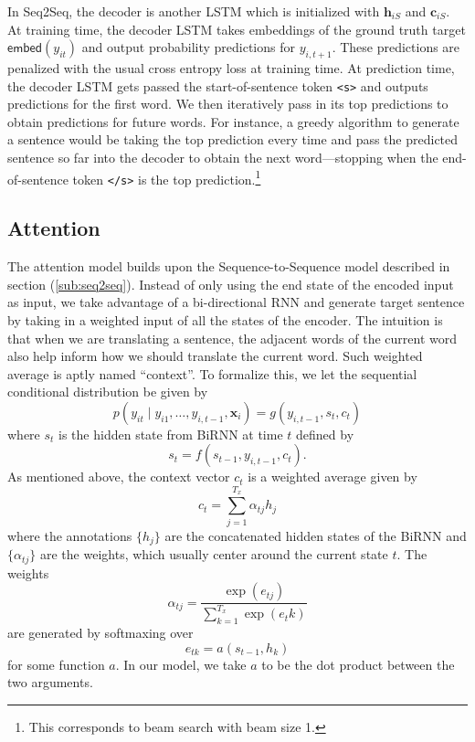 \documentclass[12pt]{article}
\newcommand{\sts}{Seq2Seq}
\newcommand{\embed}{\mathsf{embed}}
\begin{document}
In \sts{}, the decoder is another LSTM which is initialized with $\bm h_{iS}$ and $\bm c_{iS}$. At training time, the decoder LSTM takes embeddings of the ground truth target $\embed(y_{it})$ and output probability predictions for $y_{i,t+1}$. These predictions are penalized with the usual cross entropy loss at training time. At prediction time, the decoder LSTM gets passed the start-of-sentence token \texttt{<s>} and outputs predictions for the first word. We then iteratively pass in its top predictions to obtain predictions for future words. For instance, a greedy algorithm to generate a sentence would be taking the top prediction every time and pass the predicted sentence so far into the decoder to obtain the next word---stopping when the end-of-sentence token \texttt{</s>} is the top prediction.\footnote{This corresponds to beam search with beam size 1.}  

\subsection{Attention}
\label{sub:attn}
The attention model builds upon the Sequence-to-Sequence model described in section (\ref{sub:seq2seq}). Instead of only using the end state of the encoded input as input, we take advantage of a bi-directional RNN and generate target sentence by taking in a weighted input of all the states of the encoder. The intuition is that when we are translating a sentence, the adjacent words of the current word also help inform how we should translate the current word. Such weighted average is aptly named ``context''. To formalize this, we let the sequential conditional distribution be given by
\begin{equation}
	p(y_{it} \mid y_{i1}, \dots, y_{i,t-1}, \bm x_i) = g(y_{i,t-1}, s_t, c_t)
\end{equation}
where $s_t$ is the hidden state from BiRNN at time $t$ defined by
\begin{equation}
	s_t = f(s_{t-1}, y_{i,t-1}, c_t).
\end{equation}
As mentioned above, the context vector $c_t$ is a weighted average given by
\begin{equation}
	c_t = \sum_{j=1}^{T_x} \alpha_{tj} h_j
\end{equation}
where the annotations $\{h_j\}$ are the concatenated hidden states of the BiRNN and $\{\alpha_{tj}\}$ are the weights, which usually center around the current state $t$. The weights 
\begin{equation}
	\alpha_{tj} = \frac{\exp(e_{tj})}{\sum_{k=1}^{T_x} \exp(e_tk)}
\end{equation}
are generated by softmaxing over
\begin{equation}
	e_{tk} = a(s_{t-1}, h_k)
\end{equation}
for some function $a$. In our model, we take $a$ to be the dot product between the two arguments.
\end{document}
